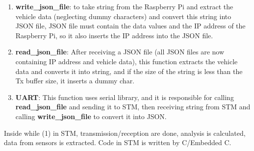 \begin{enumerate}
    \item \textbf{write\_json\_file}: to take string from the Raspberry Pi  and extract the vehicle data (neglecting dummy characters) and convert this string into JSON file, JSON file must contain the data values and the IP address of the Raspberry Pi, so it also inserts the IP address into the JSON file.
    \item \textbf{read\_json\_file}: After receiving a JSON file (all JSON files are now containing IP address and vehicle data), this function extracts the vehicle data and converts it into string, and if the size of the string is less than the Tx buffer size, it inserts a dummy char.
    \item \textbf{UART}: This function uses serial library, and it is responsible for calling \textbf{read\_json\_file} and sending it to STM, then receiving string from STM and calling \textbf{write\_json\_file} to convert it into JSON.
    
\end{enumerate}
Inside while (1) in STM, transmission/reception are done, analysis is calculated, data from sensors is extracted. Code in STM is written by C/Embedded C.

